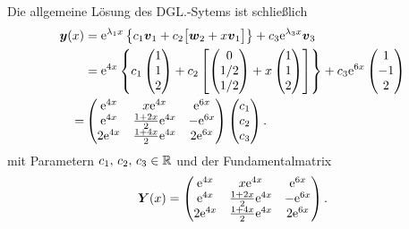 {Die allgemeine L\"osung des DGL.-Sytems ist schließlich 
\begin{align*}
   \boldsymbol{y}(x) & =  \mathrm{e}^{\lambda_1 x} \left\{ c_1 \boldsymbol{v}_1 
    + c_2 \big[ \boldsymbol{w}_2 + x \boldsymbol{v}_1 \big]\right\}
    + c_3 \mathrm{e}^{\lambda_3 x}\boldsymbol v_3\\
   & = \mathrm{e}^{4x} \left\{ c_1 \begin{pmatrix}1\\1\\2\end{pmatrix}
    + c_2 \left[\begin{pmatrix}0\\1/2\\1/2\end{pmatrix} + x \begin{pmatrix}1\\ 1\\ 2\end{pmatrix} \right]
\right\}+ c_3 \mathrm{e}^{6x} \begin{pmatrix}1\\-1\\2\end{pmatrix}\\
=& \begin{pmatrix}
\mathrm{e}^{4x} & x\mathrm{e}^{4x} & \mathrm{e}^{6x} \\
\mathrm{e}^{4x} & \frac{1+2x}2\mathrm{e}^{4x} &-\mathrm{e}^{6x} \\
2\mathrm{e}^{4x} & \frac{1+4x}2\mathrm{e}^{4x} &2\mathrm{e}^{6x}
\end{pmatrix}\begin{pmatrix}c_1\\c_2\\c_3\end{pmatrix}.
\end{align*}
mit Parametern $c_1,\,c_2,\, c_3\in\mathbb{R}$
und der Fundamentalmatrix
$$\boldsymbol Y(x)=  \begin{pmatrix}
\mathrm{e}^{4x} & x\mathrm{e}^{4x} & \mathrm{e}^{6x} \\
\mathrm{e}^{4x} & \frac{1+2x}2\mathrm{e}^{4x} &-\mathrm{e}^{6x} \\
2\mathrm{e}^{4x} & \frac{1+4x}2\mathrm{e}^{4x} &2\mathrm{e}^{6x}
\end{pmatrix}.$$


}


{

}

